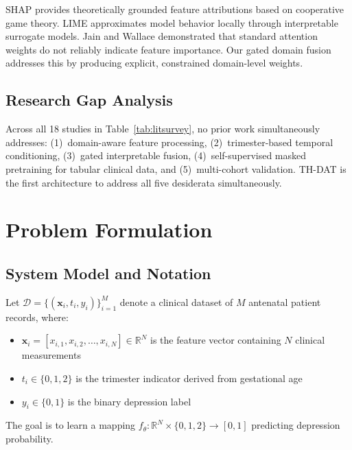 \documentclass[12pt,a4paper]{article}
\begin{document}
SHAP\cite{lundberg2017} provides theoretically grounded feature attributions based on cooperative game theory. LIME\cite{ribeiro2016} approximates model behavior locally through interpretable surrogate models. Jain and Wallace\cite{jain2019} demonstrated that standard attention weights do not reliably indicate feature importance. Our gated domain fusion addresses this by producing explicit, constrained domain-level weights.

\subsection{Research Gap Analysis}

Across all 18 studies in Table~\ref{tab:litsurvey}, no prior work simultaneously addresses: (1)~domain-aware feature processing, (2)~trimester-based temporal conditioning, (3)~gated interpretable fusion, (4)~self-supervised masked pretraining for tabular clinical data, and (5)~multi-cohort validation. TH-DAT is the first architecture to address all five desiderata simultaneously.

\section{Problem Formulation}

\subsection{System Model and Notation}

Let $\mathcal{D} = \{(\mathbf{x}_i, t_i, y_i)\}_{i=1}^{M}$ denote a clinical dataset of $M$ antenatal patient records, where:
\begin{itemize}
    \item $\mathbf{x}_i = [x_{i,1}, x_{i,2}, \ldots, x_{i,N}] \in \mathbb{R}^N$ is the feature vector containing $N$ clinical measurements
    \item $t_i \in \{0, 1, 2\}$ is the trimester indicator derived from gestational age
    \item $y_i \in \{0, 1\}$ is the binary depression label
\end{itemize}

The goal is to learn a mapping $f_\theta: \mathbb{R}^N \times \{0,1,2\} \rightarrow [0,1]$ predicting depression probability.
\end{document}
